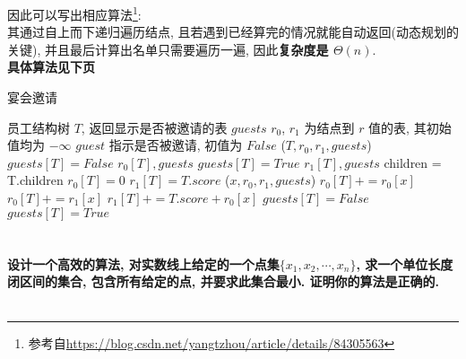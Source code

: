 \documentclass[UTF8]{article}
\newcommand{\jumpLine} {\hspace*{\fill} \\}
\begin{document}
\noindent 因此可以写出相应算法\footnote{参考自\url{https://blog.csdn.net/yangtzhou/article/details/84305563}}:\\
其通过自上而下递归遍历结点, 且若遇到已经算完的情况就能自动返回(动态规划的关键), 并且最后计算出名单只需要遍历一遍, 因此\textbf{复杂度是 $\Theta(n)$}.\\
\textbf{具体算法见下页}\\
\begin{minipage}{\linewidth*7/7}
	\begin{algorithm}[H]
		\caption{宴会邀请}
		\begin{algorithmic}[1] %
			\Require 员工结构树 $T$, 返回显示是否被邀请的表 $guests$
			 
			\State $r_0$, $r_1$ 为结点到 $r$ 值的表, 其初始值均为 $-\infty$
			\State $guest$ 指示是否被邀请, 初值为 $False$
			($T, r_0, r_1, guests$)
				\State $guests[T]=False$
				\State \Return $r_0[T], guests$
			\Else
				\State $guests[T]=True$
				\State \Return $r_1[T], guests$
			\EndIf
			\EndFunction
			\State
				\State \Return 
			\EndIf
			 
				\State \Return
			\EndIf
			\State children = T.children
			\State $r_0[T]=0$
			\State $r_1[T]=T.score$
				($x, r_0, r_1, guests$)
				 
					\State $r_0[T] += r_0[x]$
				\Else {}
					\State $r_0[T] += r_1[x]$
				\EndIf
				\State $r_1[T] += T.score + r_0[x]$  
			\EndFor
				\State $guests[T]=False$
			\Else
				\State $guests[T]=True$
			\EndIf
			\EndFunction
		\end{algorithmic}
	\end{algorithm}
\end{minipage}

\newpage 
\section{}
\textbf{设计一个高效的算法, 对实数线上给定的一个点集$\{x_1,x_2,\cdots,x_n\}$, 求一个单位长度闭区间的集合, 包含所有给定的点, 并要求此集合最小. 证明你的算法是正确的.}\\
\jumpLine
\end{document}
